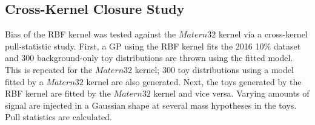 \subsection{Cross-Kernel Closure Study}

Bias of the RBF kernel was tested against the $Matern32$ kernel via a cross-kernel pull-statistic study. First, a GP using the RBF kernel fits the 2016 10$\%$ dataset and 300 background-only toy distributions are thrown using the fitted model. This is repeated for the $Matern32$ kernel; 300 toy distributions using a model fitted by a $Matern32$ kernel are also generated. Next, the toys generated by the RBF kernel are fitted by the $Matern32$ kernel and vice versa. Varying amounts of signal are injected in a Gaussian shape at several mass hypotheses in the toys. Pull statistics are calculated.